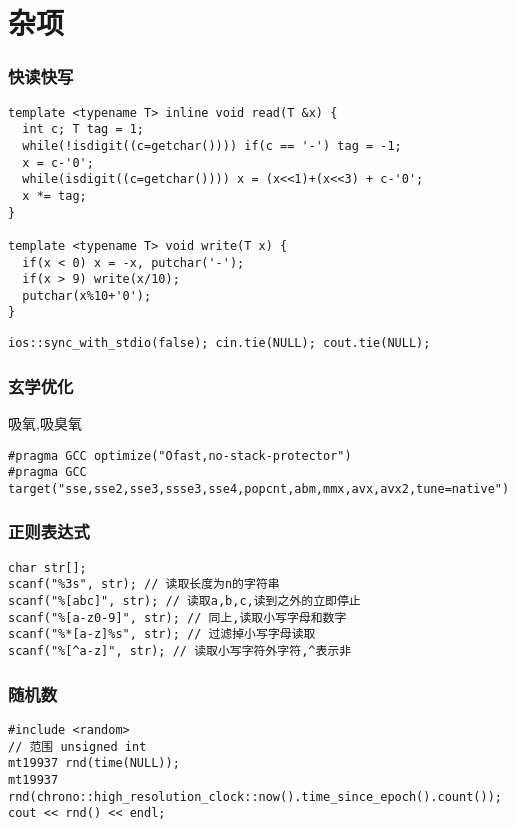\documentclass[12pt]{article}
\begin{document}
     
\tableofcontents
\newpage

\part{杂项}
\section{快读快写}
{\setmainfont{Consolas}
\begin{lstlisting}
template <typename T> inline void read(T &x) {
  int c; T tag = 1;
  while(!isdigit((c=getchar()))) if(c == '-') tag = -1;
  x = c-'0';
  while(isdigit((c=getchar()))) x = (x<<1)+(x<<3) + c-'0';
  x *= tag;
}

template <typename T> void write(T x) {
  if(x < 0) x = -x, putchar('-');
  if(x > 9) write(x/10);
  putchar(x%10+'0');
}
\end{lstlisting}
{\setmainfont{Consolas}
\begin{lstlisting}
ios::sync_with_stdio(false); cin.tie(NULL); cout.tie(NULL);
\end{lstlisting}


\section{玄学优化}

吸氧,吸臭氧
{\setmainfont{Consolas}
\begin{lstlisting}
#pragma GCC optimize("Ofast,no-stack-protector")
#pragma GCC target("sse,sse2,sse3,ssse3,sse4,popcnt,abm,mmx,avx,avx2,tune=native")
\end{lstlisting}

\section{正则表达式}
{\setmainfont{Consolas}
\begin{lstlisting}
char str[];
scanf("%3s", str); // 读取长度为n的字符串
scanf("%[abc]", str); // 读取a,b,c,读到之外的立即停止
scanf("%[a-z0-9]", str); // 同上,读取小写字母和数字
scanf("%*[a-z]%s", str); // 过滤掉小写字母读取
scanf("%[^a-z]", str); // 读取小写字符外字符,^表示非 
\end{lstlisting}
\section{随机数}
{\setmainfont{Consolas}
\begin{lstlisting}
#include <random>
// 范围 unsigned int
mt19937 rnd(time(NULL));
mt19937 rnd(chrono::high_resolution_clock::now().time_since_epoch().count());
cout << rnd() << endl;


\end{lstlisting}}}}}}
\end{document}
